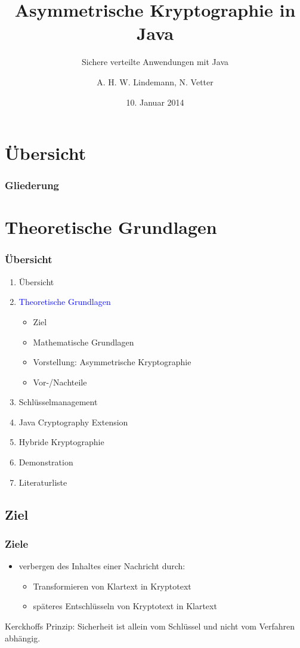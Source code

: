 \documentclass{beamer}
\title{Asymmetrische Kryptographie in Java}
\subtitle{Sichere verteilte Anwendungen mit Java}
\author{A. H. W. Lindemann, N. Vetter}
\date{10. Januar 2014}
\institute[Universität Potsdam]{
	Institut für Informatik
}
\begin{document}
\begin{frame}
\titlepage
\end{frame}

\section{Übersicht}
\begin{frame}
\frametitle{Gliederung}
\tableofcontents
\end{frame}
\section{Theoretische Grundlagen}
\begin{frame}
\frametitle{Übersicht}
\begin{enumerate}
\item Übersicht
\item \textcolor{blue}{Theoretische Grundlagen}
\begin{itemize}
	\item Ziel
	\item Mathematische Grundlagen
	\item Vorstellung: Asymmetrische Kryptographie
	\item Vor-/Nachteile
\end{itemize}
\item Schlüsselmanagement
\item Java Cryptography Extension
\item Hybride Kryptographie
\item Demonstration
\item Literaturliste
\end{enumerate}
\end{frame}

\subsection*{Ziel}
\begin{frame}
\frametitle{Ziele}
\begin{itemize}
\item verbergen des Inhaltes einer Nachricht durch:
\begin{itemize}
\item Transformieren von Klartext in Kryptotext\\
\item späteres Entschlüsseln von Kryptotext in Klartext\\
\end{itemize}
\end{itemize}
\begin{block}{Kerckhoffs Prinzip:}
\glqq Sicherheit ist allein vom Schlüssel und nicht vom Verfahren abhängig.\grqq 
\end{block}
 
\end{frame}
\end{document}
